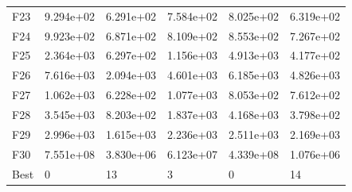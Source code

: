 \begin{tabular}{llllll}
F23  &  9.294e+02 &  6.291e+02 &  7.584e+02 &  8.025e+02 &  6.319e+02 \\
F24  &  9.923e+02 &  6.871e+02 &  8.109e+02 &  8.553e+02 &  7.267e+02 \\
F25  &  2.364e+03 &  6.297e+02 &  1.156e+03 &  4.913e+03 &  4.177e+02 \\
F26  &  7.616e+03 &  2.094e+03 &  4.601e+03 &  6.185e+03 &  4.826e+03 \\
F27  &  1.062e+03 &  6.228e+02 &  1.077e+03 &  8.053e+02 &  7.612e+02 \\
F28  &  3.545e+03 &  8.203e+02 &  1.837e+03 &  4.168e+03 &  3.798e+02 \\
F29  &  2.996e+03 &  1.615e+03 &  2.236e+03 &  2.511e+03 &  2.169e+03 \\
F30  &  7.551e+08 &  3.830e+06 &  6.123e+07 &  4.339e+08 &  1.076e+06 \\
Best &          0 &         13 &          3 &          0 &         14 \\
\bottomrule
\end{tabular}
